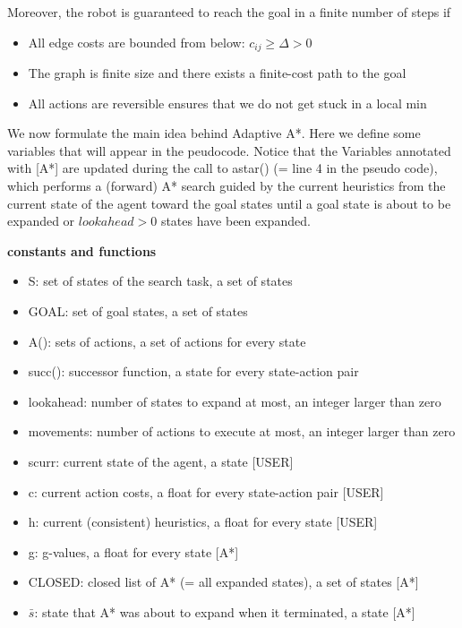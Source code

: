 \documentclass{article} %
\begin{document}
Moreover, the robot is guaranteed to reach the goal in a finite number of steps if 
\begin{itemize}
    \item All edge costs are bounded from below: $c_{i j} \geq \Delta>0$
    \item The graph is finite size and there exists a finite-cost path to the goal
    \item All actions are reversible ensures that we do not get stuck in a local min
\end{itemize}

We now formulate the main idea behind Adaptive A*.
Here we define some variables that will appear in the peudocode. Notice that the Variables annotated with [A*] are updated during the call to astar() (= line 4 in the pseudo code), which performs a (forward) A* search guided by the current heuristics from the current state of the agent toward the goal states until a goal state is about to be expanded or $lookahead > 0$ states have been expanded.

\textbf{constants and functions}
\begin{itemize}
    \item S: set of states of the search task, a set of states
    \item GOAL: set of goal states, a set of states
    \item A(): sets of actions, a set of actions for every state
    \item succ(): successor function, a state for every state-action pair
    \item lookahead: number of states to expand at most, an integer larger than zero
    \item movements: number of actions to execute at most, an integer larger than zero
    \item scurr: current state of the agent, a state [USER]
    \item c: current action costs, a float for every state-action pair [USER]
    \item h: current (consistent) heuristics, a float for every state [USER]
    \item g: g-values, a float for every state [A*]
    \item CLOSED: closed list of A* (= all expanded states), a set of states [A*]
    \item $\bar{s}$: state that A* was about to expand when it terminated, a state [A*]
\end{itemize}
\end{document}
